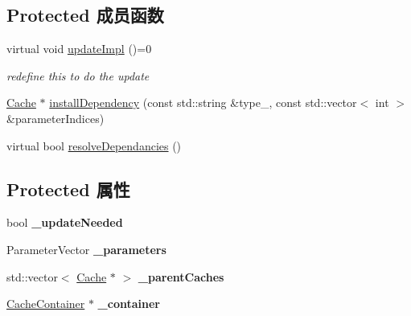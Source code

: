 \subsection*{Protected 成员函数}
\begin{DoxyCompactItemize}
\item 
\hypertarget{classg2o_1_1Cache_ae46e4a4e37c034925edd6bbfdfaa1cb2}{virtual void \hyperlink{classg2o_1_1Cache_ae46e4a4e37c034925edd6bbfdfaa1cb2}{update\-Impl} ()=0}\label{classg2o_1_1Cache_ae46e4a4e37c034925edd6bbfdfaa1cb2}

\begin{DoxyCompactList}\small\item\em redefine this to do the update \end{DoxyCompactList}\item 
\hyperlink{classg2o_1_1Cache}{Cache} $\ast$ \hyperlink{classg2o_1_1Cache_a776574fb98726ff61bc1280ea624c6e5}{install\-Dependency} (const std\-::string \&type\-\_\-, const std\-::vector$<$ int $>$ \&parameter\-Indices)
\item 
virtual bool \hyperlink{classg2o_1_1Cache_a0c26f0baa33a5902002f1ca2d5f57ece}{resolve\-Dependancies} ()
\end{DoxyCompactItemize}
\subsection*{Protected 属性}
\begin{DoxyCompactItemize}
\item 
\hypertarget{classg2o_1_1Cache_a28d0ad45da71d9b7bc6de4cf1fb0f9e4}{bool {\bfseries \-\_\-update\-Needed}}\label{classg2o_1_1Cache_a28d0ad45da71d9b7bc6de4cf1fb0f9e4}

\item 
\hypertarget{classg2o_1_1Cache_ad596a1a7591adece4664a43fc87b881d}{Parameter\-Vector {\bfseries \-\_\-parameters}}\label{classg2o_1_1Cache_ad596a1a7591adece4664a43fc87b881d}

\item 
\hypertarget{classg2o_1_1Cache_a0b38f0c773c02903acf8964f73c3aa26}{std\-::vector$<$ \hyperlink{classg2o_1_1Cache}{Cache} $\ast$ $>$ {\bfseries \-\_\-parent\-Caches}}\label{classg2o_1_1Cache_a0b38f0c773c02903acf8964f73c3aa26}

\item 
\hypertarget{classg2o_1_1Cache_a098aeecd7f0daa19a58f710ae7cb27c3}{\hyperlink{classg2o_1_1CacheContainer}{Cache\-Container} $\ast$ {\bfseries \-\_\-container}}\label{classg2o_1_1Cache_a098aeecd7f0daa19a58f710ae7cb27c3}

\end{DoxyCompactItemize}
